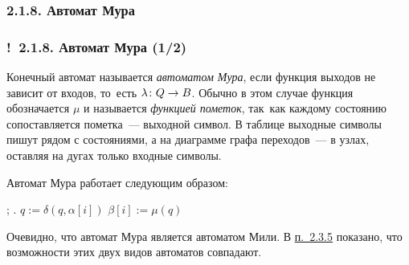 \documentclass[mathserif,12pt,aspectratio=169]{beamer}
\renewcommand{\index}[1]{}
\def\odmkey#1#2{{\it\color{red} #1}\index{#2}}
\def\Map#1#2#3{{#1}\colon{#2}\nolinebreak\to\nolinebreak{#3}}
\def\DMref#1#2{{\color{blue}\underline{\hyperlink{#2}{#1}}}}
\def\Ok{{\color{green}\textbf{!}\ }}
\begin{document}
\subsubsection{2.1.8. Автомат Мура}
\begin{frame}
\frametitle{\Ok 2.1.8. Автомат Мура (1/2)}
Конечный автомат называется \odmkey{автоматом Мура}{Автомат!Мура},
 если функция выходов
не зависит от входов, то~есть $\Map{\lambda}{Q}{B}$. Обычно в этом
случае функция обозначается $\mu$  и называется
\odmkey{функцией пометок}{Функция!пометок}, так~как каждому
состоянию сопоставляется пометка~--- выходной символ. В таблице
выходные символы пишут рядом с состояниями, а на диаграмме графа
переходов~--- в узлах, оставляя на дугах только
входные символы.

Автомат Мура работает следующим образом:


\begin{algorithmic}
;
.
 \STATE $q:=\delta(q,\alpha[i])$ 
 \STATE $\beta[i]:=\mu(q)$ 
\ENDFOR
\end{algorithmic}

Очевидно, что автомат Мура является автоматом Мили. 
В \DMref{п.~2.3.5}{2.3.5.} показано, что возможности этих двух видов автоматов
совпадают.
\end{frame}
\end{document}
